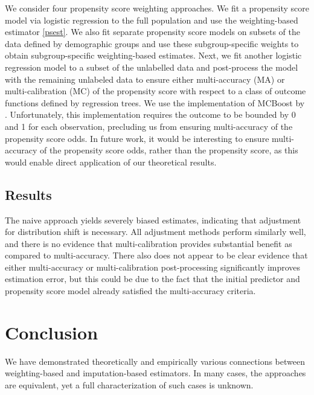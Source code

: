 \documentclass{article} %
\begin{document}
We consider four propensity score weighting approaches. We fit a propensity score model via logistic regression to the full population and use the weighting-based estimator \ref{psest}. We also fit separate propensity score models on subsets of the data defined by demographic groups and use these subgroup-specific weights to obtain subgroup-specific weighting-based estimates. Next, we fit another logistic regression model to a subset of the unlabelled data and post-process the model with the remaining unlabeled data to ensure either multi-accuracy (MA) or multi-calibration (MC) of the propensity score with respect to a class of outcome functions defined by regression trees.  We use the implementation of MCBoost by \cite{kim2022universal}. Unfortunately, this implementation requires the outcome to be bounded by 0 and 1 for each observation, precluding us from ensuring multi-accuracy of the propensity score odds. In future work, it would be interesting to ensure multi-accuracy of the propensity score odds, rather than the propensity score, as this would enable direct application of our theoretical results.

\subsection{Results}
The naive approach yields severely biased estimates, indicating that adjustment for distribution shift is necessary. All adjustment methods perform similarly well, and there is no evidence that multi-calibration provides substantial benefit as compared to multi-accuracy. There also does not appear to be clear evidence that either multi-accuracy or multi-calibration post-processing significantly improves estimation error, but this could be due to the fact that the initial predictor and propensity score model already satisfied the multi-accuracy criteria. 

\section{Conclusion}
We have demonstrated theoretically and empirically various connections between weighting-based and imputation-based estimators. In many cases, the approaches are equivalent, yet a full characterization of such cases is unknown.
\end{document}
